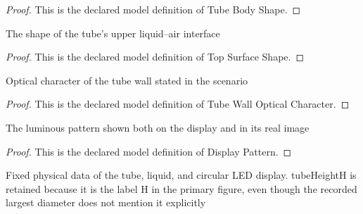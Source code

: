 \begin{proof}
  This is the declared model definition of Tube Body Shape.
\end{proof}
\begin{definition}
  \label{def:physics:phyx-mini-0110:phyxminiproblems-problemphyxmini0110-topsurfaceshape}
  The shape of the tube's upper liquid--air interface
\end{definition}
\begin{proof}
  This is the declared model definition of Top Surface Shape.
\end{proof}
\begin{definition}
  \label{def:physics:phyx-mini-0110:phyxminiproblems-problemphyxmini0110-tubewallopticalcharacter}
  Optical character of the tube wall stated in the scenario
\end{definition}
\begin{proof}
  This is the declared model definition of Tube Wall Optical Character.
\end{proof}
\begin{definition}
  \label{def:physics:phyx-mini-0110:phyxminiproblems-problemphyxmini0110-displaypattern}
  The luminous pattern shown both on the display and in its real image
\end{definition}
\begin{proof}
  This is the declared model definition of Display Pattern.
\end{proof}
\begin{definition}
  \label{def:physics:phyx-mini-0110:phyxminiproblems-problemphyxmini0110-quinolinetubesetup}
  Fixed physical data of the tube, liquid, and circular LED display. tubeHeightH is retained because it is the label H in the primary figure, even though the recorded largest diameter does not mention it explicitly
\end{definition}
